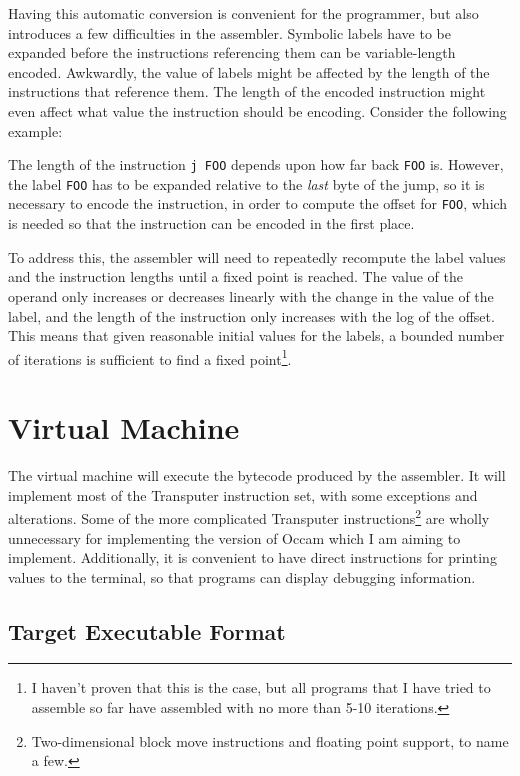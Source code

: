 Having this automatic conversion is convenient for the programmer, but also
introduces a few difficulties in the assembler. Symbolic labels have to be
expanded before the instructions referencing them can be variable-length
encoded. Awkwardly, the value of labels might be affected by the length of
the instructions that reference them. The length of the encoded instruction
might even affect what value the instruction should be encoding.
Consider the following example:


The length of the instruction \texttt{j FOO} depends upon how far back
\texttt{FOO} is. However, the label \texttt{FOO} has to be expanded relative to
the \textit{last} byte of the jump, so it is necessary to encode the
instruction, in order to compute the offset for \texttt{FOO}, which is needed so
that the instruction can be encoded in the first place.

To address this, the assembler will need to repeatedly recompute the label
values and the instruction lengths until a fixed point is reached. The value of
the operand only increases or decreases linearly with the change in the value of
the label, and the length of the instruction only increases with the log of the
offset. This means that given reasonable initial values for the labels, a
bounded number of iterations is sufficient to find a fixed point\footnote{I
haven't proven that this is the case, but all programs that I have tried to
assemble so far have assembled with no more than 5-10 iterations.}.

\section{Virtual Machine}

The virtual machine will execute the bytecode produced by the assembler. It will
implement most of the Transputer instruction set, with some exceptions and
alterations. Some of the more complicated Transputer
instructions\footnote{Two-dimensional block move instructions and floating point
support, to name a few.} are wholly unnecessary for implementing the version of
Occam which I am aiming to implement. Additionally, it is convenient to have
direct instructions for printing values to the terminal, so that programs can
display debugging information.

\subsection{Target Executable Format} \label{binary-format}

